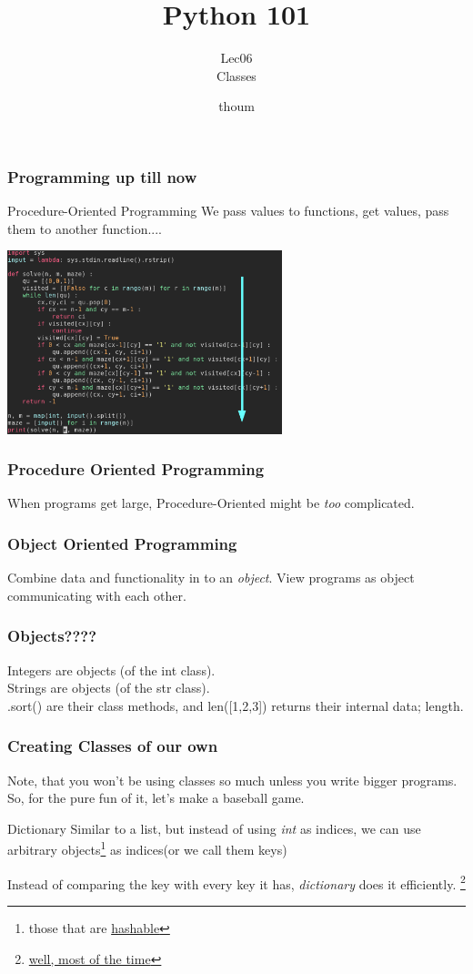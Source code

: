 \documentclass{beamer}
\title{Python 101}
\subtitle{Lec06 \\ Classes}
\author{thoum}
\begin{document}
\frame{\titlepage}

\begin{frame}
\frametitle{Programming up till now}
Procedure-Oriented Programming
We pass values to functions, get values, pass them to another function....
  \begin{center}
  \includegraphics[width=80mm]{./code.png}
  \end{center}
\end{frame}

\begin{frame}
\frametitle{Procedure Oriented Programming}
  When programs get large, Procedure-Oriented might be \textit{too}
  complicated.\\
\end{frame}

\begin{frame}
\frametitle{Object Oriented Programming}
  Combine data and functionality in to an \textit{object}.
  View programs as object communicating with each other.
\end{frame}

\begin{frame}
\frametitle{Objects????}
  Integers are objects (of the int class).\\
  Strings are objects (of the str class).\\
  [1,2,3].sort() are their class methods, and len([1,2,3]) returns their
  internal data; length.
\end{frame}

\begin{frame}
\frametitle{Creating Classes of our own}
  Note, that you won't be using classes so much unless you write bigger
  programs. So, for the pure fun of it, let's make a baseball game.
\end{frame}

\begin{frame}{Dictionary}
  Similar to a list, but instead of using \textit{int} as indices, we can use
  arbitrary objects\footnote{those that are
  \href{https://docs.python.org/2/glossary.html\#term-hashable}{hashable}}
  as indices(or we call them keys)

  Instead of comparing the key with every key it has, \textit{dictionary} does
  it efficiently.
  \footnote{\href{https://en.wikipedia.org/wiki/Collision_(computer_science)}{well, most of the time}}
\end{frame}
\end{document}
